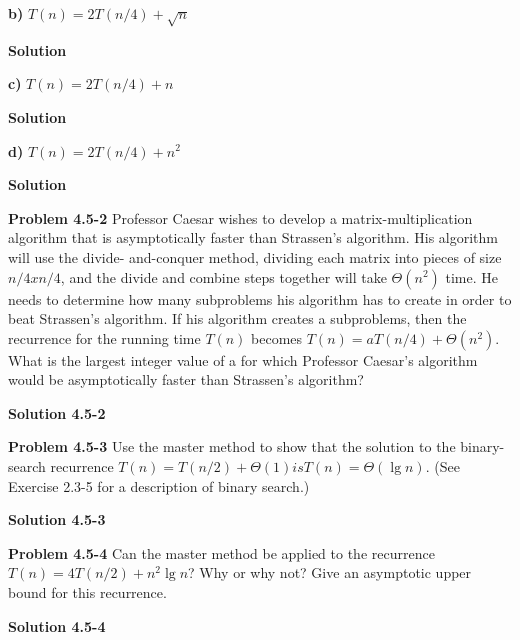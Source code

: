 \documentclass{article}
\begin{document}
\medskip

\textbf{b)} $T(n) = 2T(n/4) + \sqrt{n}$

\medskip

\textbf{Solution}

\medskip

\textbf{c)} $T(n) = 2T(n/4) + n$

\medskip

\textbf{Solution}

\medskip

\textbf{d)} $T(n) = 2T(n/4) + n^2$

\medskip

\textbf{Solution}

\hrulefill

\medskip

\textbf{Problem 4.5-2} Professor Caesar wishes to develop a matrix-multiplication algorithm that is asymptotically faster than Strassen’s algorithm. His algorithm will use the divide- and-conquer method, dividing each matrix into pieces of size $n/4 x n/4$, and the divide and combine steps together will take $\Theta(n^2)$ time. He needs to determine how many subproblems his algorithm has to create in order to beat Strassen’s algorithm. If his algorithm creates a subproblems, then the recurrence for the running time $T(n)$ becomes $T(n) = aT(n/4) + \Theta(n^2)$. What is the largest integer value of a for which Professor Caesar’s algorithm would be asymptotically faster than Strassen’s algorithm?

\medskip

\textbf{Solution 4.5-2}

\hrulefill

\medskip

\textbf{Problem 4.5-3} Use the master method to show that the solution to the binary-search recurrence $T(n) = T(n/2) + \Theta(1) is T(n) = \Theta(\lg n)$. (See Exercise 2.3-5 for a description of binary search.)

\medskip

\textbf{Solution 4.5-3}

\hrulefill

\medskip

\textbf{Problem 4.5-4} Can the master method be applied to the recurrence $T(n) = 4T(n/2) + n^2 \lg n$? Why or why not? Give an asymptotic upper bound for this recurrence.

\medskip

\textbf{Solution 4.5-4}

\hrulefill
\end{document}

